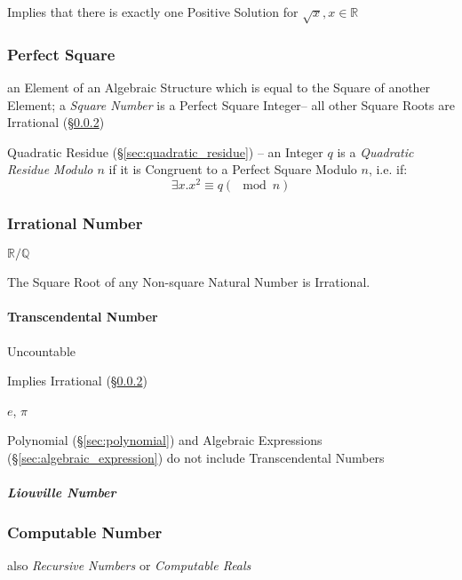 Implies that there is exactly one Positive Solution for
$\sqrt{x}, x \in \mathbb{R}$



\subsubsection{Perfect Square}\label{sec:perfect_square}

an Element of an Algebraic Structure which is equal to the Square of another
Element; a \emph{Square Number} is a Perfect Square Integer--
all other Square Roots are Irrational (\S\ref{sec:irrational})

\fist Quadratic Residue (\S\ref{sec:quadratic_residue}) -- an Integer $q$ is a
\emph{Quadratic Residue Modulo $n$} if it is Congruent to a Perfect Square
Modulo $n$, i.e. if:
\[
  \exists x . x^2 \equiv q (\mod n)
\]



\subsubsection{Irrational Number}\label{sec:irrational}

$\mathbb{R}/\mathbb{Q}$

The Square Root of any Non-square Natural Number is Irrational.



\paragraph{Transcendental Number}\label{sec:transcendental}\hfill

Uncountable

Implies Irrational (\S\ref{sec:irrational})

$e$, $\pi$

Polynomial (\S\ref{sec:polynomial}) and Algebraic Expressions
(\S\ref{sec:algebraic_expression}) do not include Transcendental Numbers



\subparagraph{Liouville Number}\label{sec:liouville_number}\hfill



\subsubsection{Computable Number}\label{sec:computable_real}

also \emph{Recursive Numbers} or \emph{Computable Reals}

